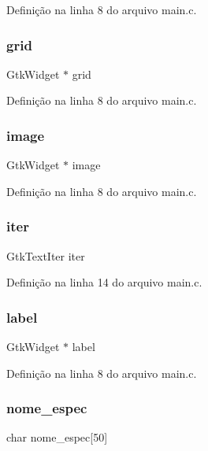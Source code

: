 Definição na linha 8 do arquivo main.\+c.

\mbox{\label{main_8c_acb167481834a304dff46ebd691b5af2a}} 
\subsubsection{grid}
{\footnotesize\ttfamily Gtk\+Widget $\ast$ grid}



Definição na linha 8 do arquivo main.\+c.

\mbox{\label{main_8c_afa2983a4006e5c36bf327f875effc361}} 
\subsubsection{image}
{\footnotesize\ttfamily Gtk\+Widget $\ast$ image}



Definição na linha 8 do arquivo main.\+c.

\mbox{\label{main_8c_a6a206d2d004ba76745f045178941724c}} 
\subsubsection{iter}
{\footnotesize\ttfamily Gtk\+Text\+Iter iter}



Definição na linha 14 do arquivo main.\+c.

\mbox{\label{main_8c_a2c7dc50d3f775e2dc807eb49216d0804}} 
\subsubsection{label}
{\footnotesize\ttfamily Gtk\+Widget $\ast$ label}



Definição na linha 8 do arquivo main.\+c.

\mbox{\label{main_8c_ac59aba9d4b97fa10a3e939647cdf7e22}} 
\subsubsection{nome\+\_\+espec}
{\footnotesize\ttfamily char nome\+\_\+espec[50]}



